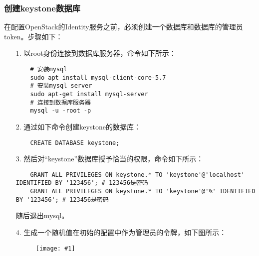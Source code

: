 \documentclass[a4paper,left=2.5cm,right=2.5cm,11pt]{article}
\newcommand{\fic}[1]{\begin{figure}[H]
		\center
		\texttt{[image: \#1]}
	\end{figure}}
\begin{document}
\subsubsection{创建keystone数据库}
	在配置OpenStack的Identity服务之前，必须创建一个数据库和数据库的管理员token。步骤如下：
	\begin{itemize}
		\item[1.] 以root身份连接到数据库服务器，命令如下所示：
		\begin{lstlisting}
	# 安装mysql
	sudo apt install mysql-client-core-5.7
	# 安装mysql server
	sudo apt-get install mysql-server
	# 连接到数据库服务器
	mysql -u -root -p
		\end{lstlisting}

		\item[2.] 通过如下命令创建keystone的数据库：
		\begin{lstlisting}
	CREATE DATABASE keystone;
		\end{lstlisting}

		\item[3.] 然后对“keystone”数据库授予恰当的权限，命令如下所示：
		\begin{lstlisting}
	GRANT ALL PRIVILEGES ON keystone.* TO 'keystone'@'localhost' IDENTIFIED BY '123456'; # 123456是密码
	GRANT ALL PRIVILEGES ON keystone.* TO 'keystone'@'%' IDENTIFIED BY '123456'; # 123456是密码
		\end{lstlisting}

		随后退出mysql。

		\item[4.] 生成一个随机值在初始的配置中作为管理员的令牌，如下图所示：
		\fic{1.png}
	\end{itemize}
\end{document}
